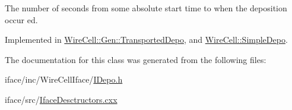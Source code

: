 The number of seconds from some absolute start time to when the deposition occur ed. 

Implemented in \hyperlink{class_wire_cell_1_1_gen_1_1_transported_depo_aa4f72056a68d1484c8d84fb27b3acacf}{Wire\+Cell\+::\+Gen\+::\+Transported\+Depo}, and \hyperlink{class_wire_cell_1_1_simple_depo_aadb43cf11d4612fcad2279b9a32d697a}{Wire\+Cell\+::\+Simple\+Depo}.



The documentation for this class was generated from the following files\+:\begin{DoxyCompactItemize}
\item 
iface/inc/\+Wire\+Cell\+Iface/\hyperlink{_i_depo_8h}{I\+Depo.\+h}\item 
iface/src/\hyperlink{_iface_desctructors_8cxx}{Iface\+Desctructors.\+cxx}\end{DoxyCompactItemize}
